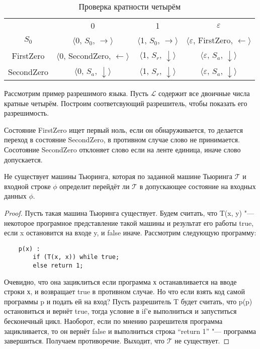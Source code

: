 \begin{table}[h]
    \centering
    \begin{tabular}{c c c c}
        & 0 & 1 & $\varepsilon$ \\
        
        $S_0$ &
        $\langle$0, $S_0$, $\rightarrow\rangle$ & 
        $\langle$1, $S_0$, $\rightarrow\rangle$ & 
        $\langle\varepsilon$, FirstZero, $\leftarrow\rangle$ \\
        
        FirstZero &
        $\langle$0, SecondZero, $\leftarrow\rangle$ &
        $\langle$1, $S_r$, $\downarrow\rangle$ &
        $\langle\varepsilon$, $S_a$, $\downarrow\rangle$ \\
        
        SecondZero &
        $\langle$0, $S_a$, $\downarrow\rangle$ &
        $\langle$1, $S_r$, $\downarrow\rangle$ &
        $\langle\varepsilon$, $S_a$, $\downarrow\rangle$ \\
    \end{tabular}
    \caption{Проверка кратности четырём}
\end{table}

Рассмотрим пример разрешимого языка. Пусть $\mathcal{L}$ содержит все двоичные числа кратные четырём.
Построим соответсвующий разрешитель, чтобы показать его разрешимость.

Состояние FirstZero ищет первый ноль, если он обнаруживается, то делается переход в состояние SecondZero,
в противном случае слово не принимается. Сосотояние SecondZero отклоняет слово если на ленте единица,
иначе слово допускается. 

\begin{theorem} Не существует машины Тьюринга, которая по заданной машине Тьюринга $\mathcal{T}$ и
входной строке $\phi$ определит перейдёт ли $\mathcal{T}$ в допускающее состояние на входных данных
$\phi$.
\end{theorem}

\begin{proof} 
Пусть такая машина Тьюринга существует. Будем считать, что T(x, y) "--- некоторое програмное
представление такой машины и результат его работы true, если x остановится на входе y, и false иначе.
Рассмотрим следующую программу:

\begin{verbatim}
    p(x) : 
        if (T(x, x)) while true;
        else return 1;
\end{verbatim}

Очевидно, что она зациклиться если программа х останавливается на вводе строки х, и возвращает true в
противном случае. Но что если взять код самой программы p и подать ей на вход? Пусть разрешитель T будет
считать, что p(p) остановиться и вернёт true, тогда условие в if'е выполниться и запуститься бесконечный
цикл. Наоборот, если по мнению разрешителя программа зацикливается, то он вернёт false и выполниться
строка ``return 1'' "--- программа завершиться. Получаем противоречие. Выходит, что $\mathcal{T}$ не
существует.
\end{proof}

